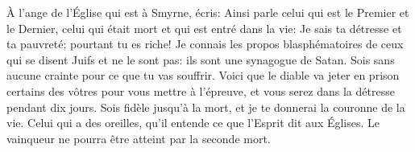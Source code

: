 À l’ange de l’Église qui est à Smyrne, écris:
	Ainsi parle celui qui est le Premier et le Dernier,
	celui qui était mort et qui est entré dans la vie:
	Je sais ta détresse et ta pauvreté; pourtant tu es riche!
Je connais les propos blasphématoires de ceux qui se disent Juifs et ne le sont pas:
	ils sont une synagogue de Satan.
Sois sans aucune crainte pour ce que tu vas souffrir.
Voici que le diable va jeter en prison certains des vôtres
	pour vous mettre à l’épreuve,
	et vous serez dans la détresse pendant dix jours.
Sois fidèle jusqu’à la mort, et je te donnerai la couronne de la vie.
Celui qui a des oreilles, qu’il entende ce que l’Esprit dit aux Églises.
	Le vainqueur ne pourra être atteint par la seconde mort.
